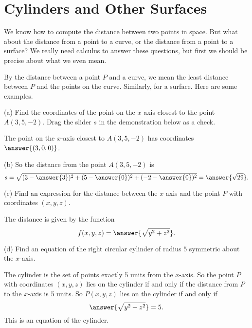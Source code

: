 \documentclass{ximera}
\begin{document}



\section*{Cylinders and Other Surfaces}
We know how to compute the distance between two points in space. But what about the distance from a point to a curve, or the distance from a point to a surface? We really need calculus to answer these questions, but first we should be precise about what we even mean.

By the distance between a point $P$ and a curve, we mean the least distance between $P$ and the points on the curve. Similarly, for a surface. Here are some examples.

\begin{question}  \label{Q:9sdfu3r5g43}
(a) Find the coordinates of the point on the $x$-axis closest to the point $A(3,5,-2)$. Drag the slider $s$ in the demonstration below as a check.

\begin{onlineOnly}
    \begin{center}
\end{center}
\end{onlineOnly}

The point on the $x$-axis closest to $A(3,5,-2)$ has coordinates $\answer{(3,0,0)}$.

(b) So the distance from the  point $A(3,5,-2)$ is 
\[
  s = \sqrt{(3-\answer{3})^2 + (5-\answer{0})^2 + (-2 - \answer{0})^2} = \answer{\sqrt{29}} .
\]

(c) Find an expression for the distance between the $x$-axis and the point $P$ with coordinates $(x,y,z)$.

The distance is given by the function 
\[
      f(x,y,z) = \answer{\sqrt{y^2 + z^2}} .
\]

(d) Find an equation of the right circular cylinder of radius $5$ symmetric about the $x$-axis.

The cylinder is the set of points exactly 5 units from the $x$-axis. So the point $P$ with coordinates $(x,y,z)$ lies on the cylinder if and only if the distance from $P$ to the $x$-axis is 5 units. So $P(x,y,z)$ lies on the cylinder if and only if
\[
     \answer{\sqrt{y^2 + z^2}} = 5 .
\]
This is an equation of the cylinder.
\end{question}
\end{document}
